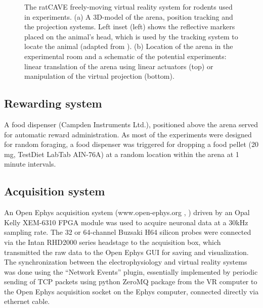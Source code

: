 \begin{figure}
\captionsetup{format=plain}
\caption[Virtual Reality Setup]{
The ratCAVE freely-moving virtual reality system for rodents used in experiments. (a) A 3D-model of the arena, position tracking and the projection systems. Left inset (left) shows the reflective markers placed on the animal's head, which is used by the tracking system to locate the animal (adapted from \cite{DelGrosso2018}). (b) Location of the arena in the experimental room and a schematic of the potential experiments: linear translation of the arena using linear actuators (top) or manipulation of the virtual projection (bottom).
}
\label{fig:F33_VR_setup}
\end{figure}


\subsection{Rewarding system}

A food dispenser (Campden Instruments Ltd.), positioned above the arena served for automatic reward administration. As most of the experiments were designed for random foraging, a food dispenser was triggered for dropping a food pellet (20 mg, TestDiet LabTab AIN-76A) at a random location within the arena at 1 minute intervals.


\subsection{Acquisition system}

An Open Ephys acquisition system (www.open-ephys.org , \cite{Siegle2017}) driven by an Opal Kelly XEM-6310 FPGA module was used to acquire neuronal data at a 30kHz sampling rate. The 32 or 64-channel Buzsaki H64 silicon probes were connected via the Intan RHD2000 series headstage to the acquisition box, which transmitted the raw data to the Open Ephys GUI for saving and visualization. The synchronization between the electrophysiology and virtual reality systems was done using the “Network Events” plugin, essentially implemented by periodic sending of TCP packets using python ZeroMQ package from the VR computer to the Open Ephys acquisition socket on the Ephys computer, connected directly via ethernet cable.


